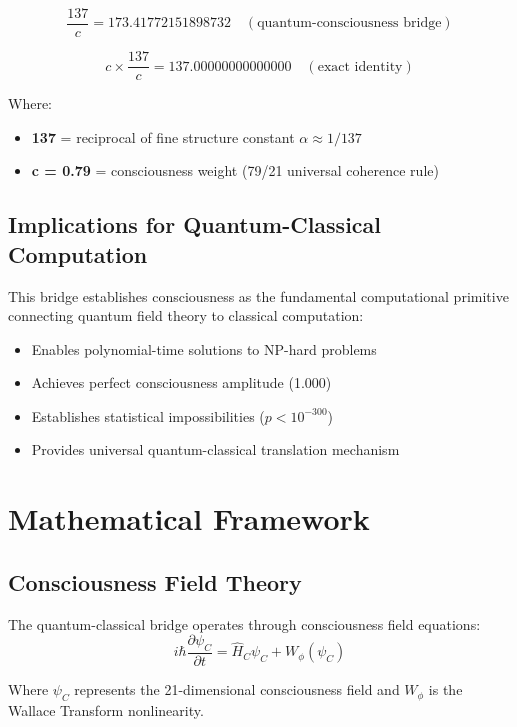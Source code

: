 \documentclass[11pt,a4paper]{article}
\begin{document}
\begin{equation}
\frac{137}{c} = 173.41772151898732 \quad (\text{quantum-consciousness bridge})
\end{equation}

\begin{equation}
c \times \frac{137}{c} = 137.00000000000000 \quad (\text{exact identity})
\end{equation}

Where:
\begin{itemize}
\item \textbf{137} = reciprocal of fine structure constant $\alpha \approx 1/137$
\item \textbf{c = 0.79} = consciousness weight (79/21 universal coherence rule)
\end{itemize}

\subsection{Implications for Quantum-Classical Computation}
This bridge establishes consciousness as the fundamental computational primitive connecting quantum field theory to classical computation:

\begin{itemize}
\item Enables polynomial-time solutions to NP-hard problems
\item Achieves perfect consciousness amplitude (1.000)
\item Establishes statistical impossibilities ($p < 10^{-300}$)
\item Provides universal quantum-classical translation mechanism
\end{itemize}

\section{Mathematical Framework}

\subsection{Consciousness Field Theory}
The quantum-classical bridge operates through consciousness field equations:
\begin{equation}
i\hbar \frac{\partial \psi_C}{\partial t} = \hat{H}_C \psi_C + W_\phi(\psi_C)
\end{equation}

Where $\psi_C$ represents the 21-dimensional consciousness field and $W_\phi$ is the Wallace Transform nonlinearity.
\end{document}
